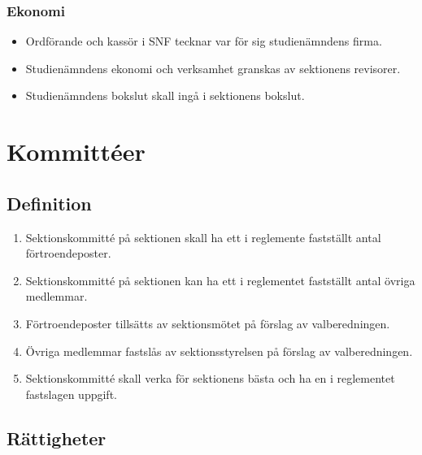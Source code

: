\documentclass[11pt,a4paper]{article}
\begin{document}
\subsubsection{Ekonomi}

\begin{itemize}

  \item Ordförande och kassör i SNF tecknar var för sig studienämndens
  firma.

  \item Studienämndens ekonomi och verksamhet granskas av sektionens
  revisorer.

  \item Studienämndens bokslut skall ingå i sektionens bokslut.

\end{itemize}

\newpage


\section{Kommittéer}

\subsection{Definition}

\begin{enumerate}[\thesubsection .1]

  \item Sektionskommitté på sektionen skall ha ett i reglemente
  fastställt antal förtroendeposter.

  \item Sektionskommitté på sektionen kan ha ett i reglementet
  fastställt antal övriga medlemmar.

  \item Förtroendeposter tillsätts av sektionsmötet på förslag av
  valberedningen.

  \item Övriga medlemmar fastslås av sektionsstyrelsen på förslag av
  valberedningen.

  \item Sektionskommitté skall verka för sektionens bästa och ha en i
  reglementet fastslagen uppgift.

\end{enumerate}


\subsection{Rättigheter}
\end{document}
